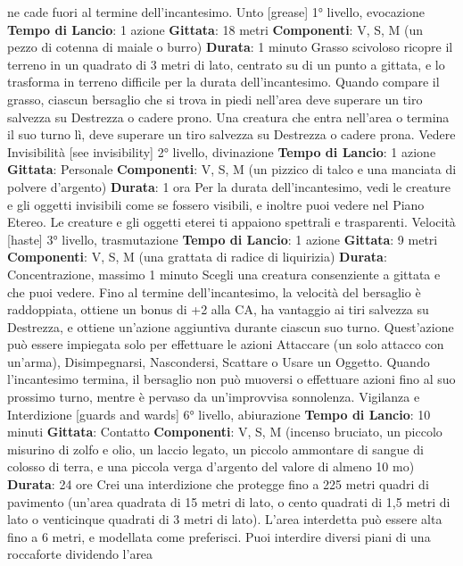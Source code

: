 \begin{multicols}{2}
ne cade fuori al termine dell’incantesimo.
Unto
[grease]
1° livello, evocazione
\textbf{Tempo di Lancio}: 1 azione
\textbf{Gittata}: 18 metri
\textbf{Componenti}: V, S, M (un pezzo di cotenna di maiale o
burro)
\textbf{Durata}: 1 minuto
Grasso scivoloso ricopre il terreno in un quadrato di 3
metri di lato, centrato su di un punto a gittata, e lo
trasforma in terreno difficile per la durata
dell’incantesimo.
Quando compare il grasso, ciascun bersaglio che si
trova in piedi nell’area deve superare un tiro salvezza
su Destrezza o cadere prono. Una creatura che entra
nell’area o termina il suo turno lì, deve superare un tiro
salvezza su Destrezza o cadere prona.
Vedere Invisibilità
[see invisibility]
2° livello, divinazione
\textbf{Tempo di Lancio}: 1 azione
\textbf{Gittata}: Personale
\textbf{Componenti}: V, S, M (un pizzico di talco e una
manciata di polvere d’argento)
\textbf{Durata}: 1 ora
Per la durata dell’incantesimo, vedi le creature e gli
oggetti invisibili come se fossero visibili, e inoltre puoi
vedere nel Piano Etereo. Le creature e gli oggetti eterei
ti appaiono spettrali e trasparenti.
Velocità
[haste]
3° livello, trasmutazione
\textbf{Tempo di Lancio}: 1 azione
\textbf{Gittata}: 9 metri
\textbf{Componenti}: V, S, M (una grattata di radice di
liquirizia)
\textbf{Durata}: Concentrazione, massimo 1 minuto
Scegli una creatura consenziente a gittata e che puoi
vedere. Fino al termine dell’incantesimo, la velocità del
bersaglio è raddoppiata, ottiene un bonus di +2 alla CA,
ha vantaggio ai tiri salvezza su Destrezza, e ottiene
un’azione aggiuntiva durante ciascun suo turno.
Quest’azione può essere impiegata solo per effettuare
le azioni Attaccare (un solo attacco con un’arma),
Disimpegnarsi, Nascondersi, Scattare o Usare un
Oggetto.
Quando l’incantesimo termina, il bersaglio non può
muoversi o effettuare azioni fino al suo prossimo turno,
mentre è pervaso da un’improvvisa sonnolenza.
Vigilanza e Interdizione
[guards and wards]
6° livello, abiurazione
\textbf{Tempo di Lancio}: 10 minuti
\textbf{Gittata}: Contatto
\textbf{Componenti}: V, S, M (incenso bruciato, un piccolo
misurino di zolfo e olio, un laccio legato, un piccolo
ammontare di sangue di colosso di terra, e una piccola
verga d’argento del valore di almeno 10 mo)
\textbf{Durata}: 24 ore
Crei una interdizione che protegge fino a 225 metri
quadri di pavimento (un’area quadrata di 15 metri di
lato, o cento quadrati di 1,5 metri di lato o venticinque
quadrati di 3 metri di lato). L’area interdetta può essere
alta fino a 6 metri, e modellata come preferisci. Puoi
interdire diversi piani di una roccaforte dividendo l’area

\end{multicols}
